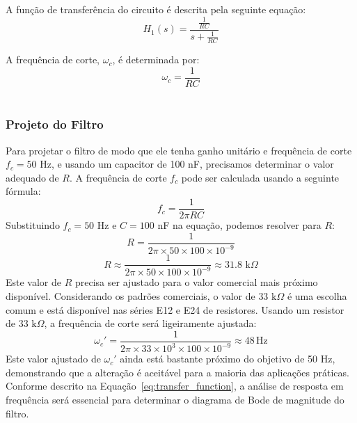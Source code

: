 \documentclass[
	12pt,				%
	openright,			%
	twoside,			%
	a4paper,			%
	english,			%
	french,				%
	spanish,			%
	brazil,				%
	]{abntex2}
\begin{document}
A função de transferência do circuito é descrita pela seguinte equação:
\begin{equation}
    H_1(s) = \frac{\frac{1}{RC}}{s + \frac{1}{RC}}
    \label{eq:first_transfer_function}
\end{equation}

A frequência de corte, \(\omega_c\), é determinada por:
\begin{equation}
    \omega_c = \frac{1}{RC}
    \label{eq:cutoff_frequency}
\end{equation}
\,

\subsubsection{Projeto do Filtro}

Para projetar o filtro de modo que ele tenha ganho unitário e frequência de corte \( f_c = 50 \) Hz, e usando um capacitor de 100 nF, precisamos determinar o valor adequado de \( R \). A frequência de corte \(f_c\) pode ser calculada usando a seguinte fórmula:
\begin{equation}
    f_c = \frac{1}{2\pi RC}
\end{equation}
Substituindo \(f_c = 50\) Hz e \(C = 100\) nF na equação, podemos resolver para \(R\):
\begin{equation}
    R = \frac{1}{2\pi \times 50 \times 100 \times 10^{-9}}
\end{equation}
\begin{equation}
    R \approx \frac{1}{2\pi \times 50 \times 100 \times 10^{-9}} \approx 31.8 \text{ k}\Omega
\end{equation}
Este valor de \(R\) precisa ser ajustado para o valor comercial mais próximo disponível. Considerando os padrões comerciais, o valor de \(33 \text{ k}\Omega\) é uma escolha comum e está disponível nas séries E12 e E24 de resistores. Usando um resistor de \(33 \text{ k}\Omega\), a frequência de corte será ligeiramente ajustada:
\begin{equation}
    \omega_c' = \frac{1}{2\pi \times 33 \times 10^3 \times 100 \times 10^{-9}} \approx 48 \, \text{Hz}
\end{equation}
Este valor ajustado de \(\omega_c'\) ainda está bastante próximo do objetivo de 50 Hz, demonstrando que a alteração é aceitável para a maioria das aplicações práticas.  Conforme descrito na Equação~\ref{eq:transfer_function}, a análise de resposta em frequência será essencial para determinar o diagrama de Bode de magnitude do filtro.
\end{document}
